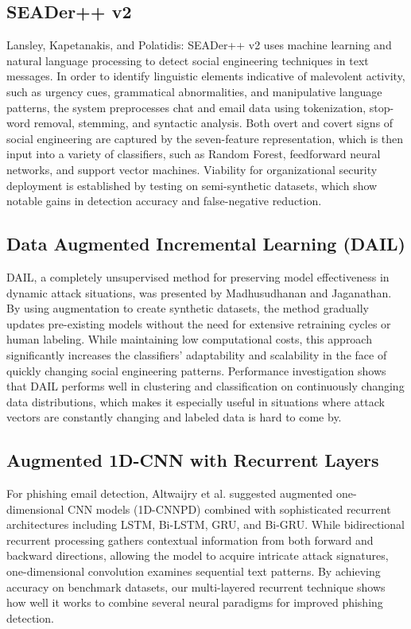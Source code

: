 \subsection{ SEADer++ v2 
}
Lansley, Kapetanakis, and Polatidis: SEADer++ v2 uses machine learning and natural language processing to detect social engineering techniques in text messages. In order to identify linguistic elements indicative of malevolent activity, such as urgency cues, grammatical abnormalities, and manipulative language patterns, the system preprocesses chat and email data using tokenization, stop-word removal, stemming, and syntactic analysis. Both overt and covert signs of social engineering are captured by the seven-feature representation, which is then input into a variety of classifiers, such as Random Forest, feedforward neural networks, and support vector machines. Viability for organizational security deployment is established by testing on semi-synthetic datasets, which show notable gains in detection accuracy and false-negative reduction.
%
\subsection{Data Augmented Incremental Learning (DAIL)}
DAIL, a completely unsupervised method for preserving model effectiveness in dynamic attack situations, was presented by Madhusudhanan and Jaganathan. By using augmentation to create synthetic datasets, the method gradually updates pre-existing models without the need for extensive retraining cycles or human labeling. While maintaining low computational costs, this approach significantly increases the classifiers' adaptability and scalability in the face of quickly changing social engineering patterns. Performance investigation shows that DAIL performs well in clustering and classification on continuously changing data distributions, which makes it especially useful in situations where attack vectors are constantly changing and labeled data is hard to come by.
%
\subsection{ Augmented 1D-CNN with Recurrent Layers}
For phishing email detection, Altwaijry et al. suggested augmented one-dimensional CNN models (1D-CNNPD) combined with sophisticated recurrent architectures including LSTM, Bi-LSTM, GRU, and Bi-GRU. While bidirectional recurrent processing gathers contextual information from both forward and backward directions, allowing the model to acquire intricate attack signatures, one-dimensional convolution examines sequential text patterns. By achieving accuracy on benchmark datasets, our multi-layered recurrent technique shows how well it works to combine several neural paradigms for improved phishing detection.
%
